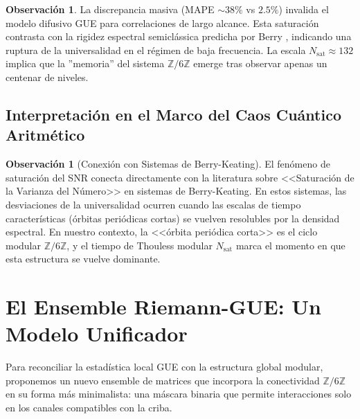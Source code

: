 \documentclass[12pt, a4paper]{article}
\theoremstyle{plain}
\theoremstyle{definition}
\newtheorem{observacion}[teorema]{Observación}
\theoremstyle{remark}
\newcommand{\Z}{\mathbb{Z}}
\begin{document}
\begin{observacion}
La discrepancia masiva (MAPE $\sim 38\%$ vs $2.5\%$) invalida el modelo difusivo GUE para correlaciones de largo alcance. Esta saturación contrasta con la rigidez espectral semiclássica predicha por Berry \cite{berry1985}, indicando una ruptura de la universalidad en el régimen de baja frecuencia. La escala $N_{\text{sat}} \approx 132$ implica que la ''memoria'' del sistema $\Z/6\Z$ emerge tras observar apenas un centenar de niveles.
\end{observacion}


\subsection{Interpretación en el Marco del Caos Cuántico Aritmético}
\label{subsec:caos_cuantico_interpretacion}

\begin{observacion}[Conexión con Sistemas de Berry-Keating]
\label{obs:conexion_berry_keating}
El fenómeno de saturación del SNR conecta directamente con la literatura sobre 
<<Saturación de la Varianza del Número>> en sistemas de Berry-Keating. En estos 
sistemas, las desviaciones de la universalidad ocurren cuando las escalas de 
tiempo características (órbitas periódicas cortas) se vuelven resolubles por 
la densidad espectral. En nuestro contexto, la <<órbita periódica corta>> es el 
ciclo modular $\mathbb{Z}/6\mathbb{Z}$, y el tiempo de Thouless modular 
$N_{\text{sat}}$ marca el momento en que esta estructura se vuelve dominante.
\end{observacion}

\section{El Ensemble Riemann-GUE: Un Modelo Unificador}
\label{sec:ensemble_riemann}

Para reconciliar la estadística local GUE con la estructura global modular, proponemos un nuevo ensemble de matrices que incorpora la conectividad $\Z/6\Z$ en su forma más minimalista: una máscara binaria que permite interacciones solo en los canales compatibles con la criba.
\end{document}
